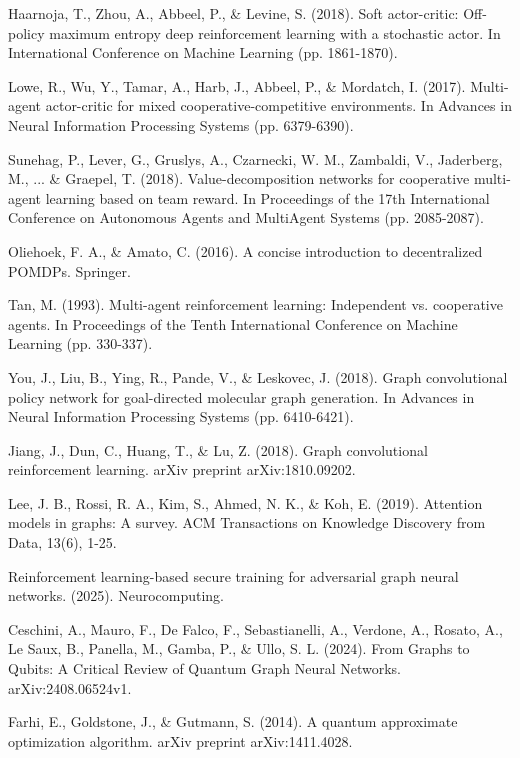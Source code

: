 \documentclass{article}
\begin{document}
\begin{thebibliography}{99}
 Haarnoja, T., Zhou, A., Abbeel, P., \& Levine, S. (2018). Soft actor-critic: Off-policy maximum entropy deep reinforcement learning with a stochastic actor. In International Conference on Machine Learning (pp. 1861-1870).

 Lowe, R., Wu, Y., Tamar, A., Harb, J., Abbeel, P., \& Mordatch, I. (2017). Multi-agent actor-critic for mixed cooperative-competitive environments. In Advances in Neural Information Processing Systems (pp. 6379-6390).

 Sunehag, P., Lever, G., Gruslys, A., Czarnecki, W. M., Zambaldi, V., Jaderberg, M., ... \& Graepel, T. (2018). Value-decomposition networks for cooperative multi-agent learning based on team reward. In Proceedings of the 17th International Conference on Autonomous Agents and MultiAgent Systems (pp. 2085-2087).

 Oliehoek, F. A., \& Amato, C. (2016). A concise introduction to decentralized POMDPs. Springer.

 Tan, M. (1993). Multi-agent reinforcement learning: Independent vs. cooperative agents. In Proceedings of the Tenth International Conference on Machine Learning (pp. 330-337).

 You, J., Liu, B., Ying, R., Pande, V., \& Leskovec, J. (2018). Graph convolutional policy network for goal-directed molecular graph generation. In Advances in Neural Information Processing Systems (pp. 6410-6421).

 Jiang, J., Dun, C., Huang, T., \& Lu, Z. (2018). Graph convolutional reinforcement learning. arXiv preprint arXiv:1810.09202.

 Lee, J. B., Rossi, R. A., Kim, S., Ahmed, N. K., \& Koh, E. (2019). Attention models in graphs: A survey. ACM Transactions on Knowledge Discovery from Data, 13(6), 1-25.

 Reinforcement learning-based secure training for adversarial graph neural networks. (2025). Neurocomputing.

 Ceschini, A., Mauro, F., De Falco, F., Sebastianelli, A., Verdone, A., Rosato, A., Le Saux, B., Panella, M., Gamba, P., \& Ullo, S. L. (2024). From Graphs to Qubits: A Critical Review of Quantum Graph Neural Networks. arXiv:2408.06524v1.

 Farhi, E., Goldstone, J., \& Gutmann, S. (2014). A quantum approximate optimization algorithm. arXiv preprint arXiv:1411.4028.

\end{thebibliography}
\end{document}
